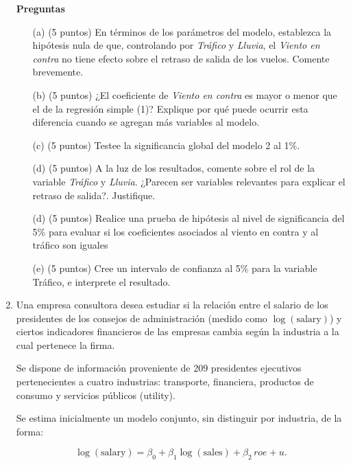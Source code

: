 \documentclass[10pt,a4paper]{article}
\begin{document}
\begin{enumerate}
\textbf{Preguntas}
\begin{enumerate}

    \item[(a)] (5 puntos) En términos de los parámetros del modelo, establezca la hipótesis nula de que, controlando por \textit{Tráfico} y \textit{Lluvia}, el \textit{Viento en contra} no tiene efecto sobre el retraso de salida de los vuelos. Comente brevemente.

    \item[(b)] (5 puntos) ¿El coeficiente de \textit{Viento en contra} es mayor o menor que el de la regresión simple (1)? Explique por qué puede ocurrir esta diferencia cuando se agregan más variables al modelo.

    \item[(c)] (5 puntos) Testee la significancia global del modelo 2 al 1\%.

    \item[(d)] (5 puntos) A la luz de los resultados, comente sobre el rol de la variable \textit{Tráfico} y \textit{Lluvia}. ¿Parecen ser variables relevantes para explicar el retraso de salida?. Justifique.

  \item[(d)] (5 puntos) Realice una prueba de hipótesis al nivel de significancia del 5\% para evaluar si los coeficientes asociados al viento en contra y al tráfico son iguales

  \item[(e)] (5 puntos) Cree un intervalo de confianza al 5\% para la variable Tráfico, e interprete el
resultado.
\end{enumerate}




\newpage
    \item  Una empresa consultora desea estudiar si la relación entre el salario de los presidentes de los 
consejos de administración (medido como $\log(\text{salary})$) y ciertos indicadores financieros 
de las empresas cambia según la industria a la cual pertenece la firma.

Se dispone de información proveniente de 209 presidentes ejecutivos pertenecientes a cuatro 
industrias: transporte, financiera, productos de consumo y servicios públicos (utility).

Se estima inicialmente un modelo conjunto, sin distinguir por industria, de la forma:

\[
\log(\text{salary}) = \beta_0 + \beta_1 \log(\text{sales}) + \beta_2 \, roe + u.
\]


\end{enumerate}
\end{document}
